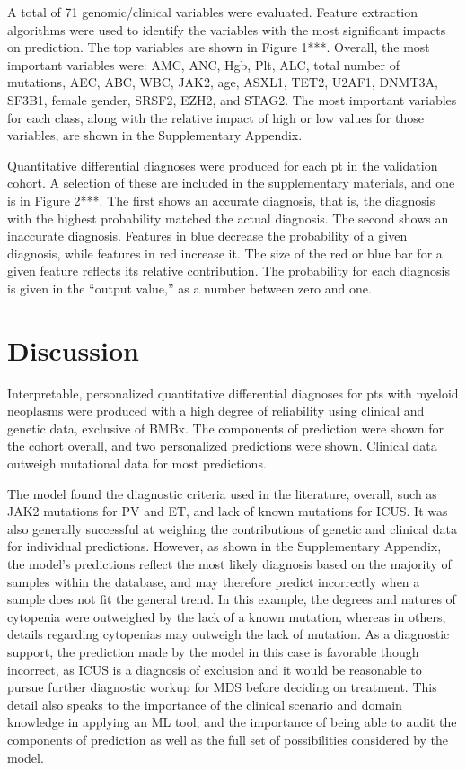 \documentclass[
]{article}
\begin{document}
A total of 71 genomic/clinical variables were evaluated. Feature
extraction algorithms were used to identify the variables with the most
significant impacts on prediction. The top variables are shown in Figure
1***. Overall, the most important variables were: AMC, ANC, Hgb, Plt,
ALC, total number of mutations, AEC, ABC, WBC, JAK2, age, ASXL1, TET2,
U2AF1, DNMT3A, SF3B1, female gender, SRSF2, EZH2, and STAG2. The most
important variables for each class, along with the relative impact of
high or low values for those variables, are shown in the Supplementary
Appendix.

Quantitative differential diagnoses were produced for each pt in the
validation cohort. A selection of these are included in the
supplementary materials, and one is in Figure 2***. The first shows an
accurate diagnosis, that is, the diagnosis with the highest probability
matched the actual diagnosis. The second shows an inaccurate diagnosis.
Features in blue decrease the probability of a given diagnosis, while
features in red increase it. The size of the red or blue bar for a given
feature reflects its relative contribution. The probability for each
diagnosis is given in the ``output value,'' as a number between zero and
one.

\hypertarget{discussion}{%
\section{Discussion}\label{discussion}}

Interpretable, personalized quantitative differential diagnoses for pts
with myeloid neoplasms were produced with a high degree of reliability
using clinical and genetic data, exclusive of BMBx. The components of
prediction were shown for the cohort overall, and two personalized
predictions were shown. Clinical data outweigh mutational data for most
predictions.

The model found the diagnostic criteria used in the literature, overall,
such as JAK2 mutations for PV and ET, and lack of known mutations for
ICUS. It was also generally successful at weighing the contributions of
genetic and clinical data for individual predictions. However, as shown
in the Supplementary Appendix, the model's predictions reflect the most
likely diagnosis based on the majority of samples within the database,
and may therefore predict incorrectly when a sample does not fit the
general trend. In this example, the degrees and natures of cytopenia
were outweighed by the lack of a known mutation, whereas in others,
details regarding cytopenias may outweigh the lack of mutation. As a
diagnostic support, the prediction made by the model in this case is
favorable though incorrect, as ICUS is a diagnosis of exclusion and it
would be reasonable to pursue further diagnostic workup for MDS before
deciding on treatment. This detail also speaks to the importance of the
clinical scenario and domain knowledge in applying an ML tool, and the
importance of being able to audit the components of prediction as well
as the full set of possibilities considered by the model.
\end{document}
